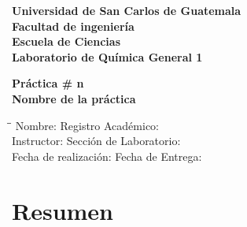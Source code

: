\documentclass[12pt,letterpaper]{article}
\begin{document}


\renewcommand{\refname}{Bibliografía}
\renewcommand{\tablename}{Tabla}
\renewcommand{\thefigure}{\roman{figure}}
\renewcommand{\thetable}{\roman{table}}



\begin{titlepage}

\begin{flushleft}
\textbf{Universidad de San Carlos de Guatemala}\\
\textbf{Facultad de ingeniería}\\
\textbf{Escuela de Ciencias}\\
\textbf{Laboratorio de Química General 1}\\
\end{flushleft}

\vspace{8 cm}

\begin{center}
\textbf{Práctica \# n}\\
{\large \textbf{Nombre de la práctica}}
\end{center}

\vspace{9 cm}

\begin{tabbing}
\hspace{3cm}\=\hspace{5cm}\=\kill
 Nombre: \>   \> Registro Académico: \\ 
 Instructor: \>   \> Sección de Laboratorio: \\ 
 Fecha de realización: \>   \> Fecha de Entrega:
\end{tabbing} 

\end{titlepage}




\section{Resumen}
\end{document}
